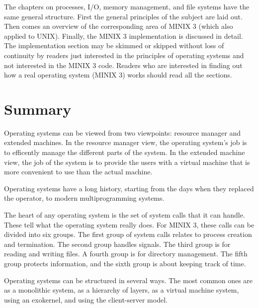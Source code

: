 \documentclass{book}
\begin{document}
The chapters on processes, I/O, memory management, and file systems have the same general structure.
First the general principles of the subject are laid out.
Then comes an overview of the corresponding area of MINIX 3 (which also applied to UNIX).
Finally, the MINIX 3 implementation is discussed in detail.
The implementation section may be skimmed or skipped without loss of continuity by readers 
just interested in the principles of operating systems and not interested in the MINIX 3 code.
Readers who are interested in finding out how a real operating system (MINIX 3) works should read all the sections.

\section{Summary}
Operating systems can be viewed from two viewpoints: resource manager and extended machines.
In the resource manager view, the operating system's job is to efficently manage the different parts of the system.
In the extended machine view, the job of the system is to provide the users with a virtual machine 
that is more convenient to use than the actual machine.
 
Operating systems have a long history, starting from the days when they replaced the operator,
to modern multiprogramming systems.

The heart of any operating system is the set of system calls that it can handle.
These tell what the operating system really does.
For MINIX 3, these calls can be divided into six groups.
The first group of system calls relates to process creation and termination.
The second group handles signals.
The third group is for reading and writing files.
A fourth group is for directory management.
The fifth group protects information, and the sixth group is about keeping track of time.

Operating systems can be structured in several ways.
The most common ones are as a monolithic system, as a hierarchy of layers, as a virtual machine system,
using an exokernel, and using the client-server model.
\end{document}

